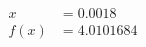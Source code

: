 \documentclass[preview]{standalone}
\begin{document}
\begin{align*}
x &= 0.0018\\f(x) &= 4.0101684
\end{align*}
\end{document}
